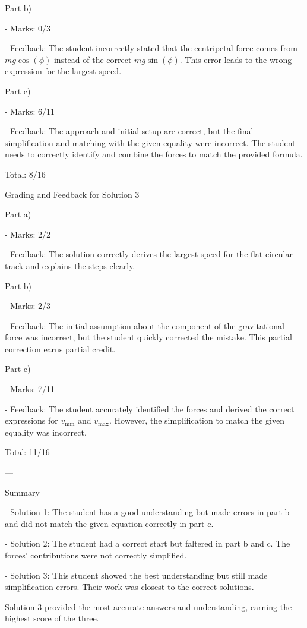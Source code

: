 \documentclass[a4paper,11pt]{article}
\begin{document}
Part b)

- Marks: 0/3

- Feedback: The student incorrectly stated that the centripetal force comes from \( mg\cos(\phi) \) instead of the correct \( mg\sin(\phi) \). This error leads to the wrong expression for the largest speed.

Part c)

- Marks: 6/11

- Feedback: The approach and initial setup are correct, but the final simplification and matching with the given equality were incorrect. The student needs to correctly identify and combine the forces to match the provided formula.

Total: 8/16

Grading and Feedback for Solution 3

Part a)

- Marks: 2/2

- Feedback: The solution correctly derives the largest speed for the flat circular track and explains the steps clearly.

Part b)

- Marks: 2/3

- Feedback: The initial assumption about the component of the gravitational force was incorrect, but the student quickly corrected the mistake. This partial correction earns partial credit.

Part c)

- Marks: 7/11

- Feedback: The student accurately identified the forces and derived the correct expressions for \( v_{\text{min}} \) and \( v_{\text{max}} \). However, the simplification to match the given equality was incorrect.

Total: 11/16

---

Summary

- Solution 1: The student has a good understanding but made errors in part b and did not match the given equation correctly in part c.

- Solution 2: The student had a correct start but faltered in part b and c. The forces' contributions were not correctly simplified.

- Solution 3: This student showed the best understanding but still made simplification errors. Their work was closest to the correct solutions.

Solution 3 provided the most accurate answers and understanding, earning the highest score of the three.
\end{document}
